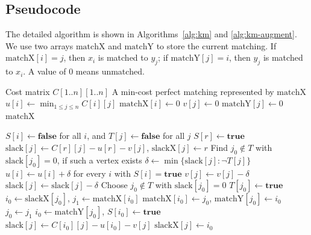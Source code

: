 \documentclass[acmsmall,nonacm]{acmart}
\theoremstyle{plain}
\theoremstyle{remark}
\begin{document}
\subsection{Pseudocode} 
\label{subsec:pseudocode}

The detailed algorithm is shown in Algorithms~\ref{alg:km} and
\ref{alg:km-augment}. We use two arrays $\text{matchX}$ and $\text{matchY}$ to
store the current matching. If $\text{matchX}[i]=j$, then $x_i$ is matched to
$y_j$; if $\text{matchY}[j]=i$, then $y_j$ is matched to $x_i$. A value of $0$
means unmatched.

\begin{algorithm}[t]
\caption{Kuhn--Munkres Algorithm for Min-Cost Perfect Matching}
\label{alg:km}
\begin{algorithmic}[1]
\Require Cost matrix $C[1..n][1..n]$
\Ensure A min-cost perfect matching represented by $\text{matchX}$
    \State $u[i] \gets \min_{1 \leq j \leq n} C[i][j]$
    \State $\text{matchX}[i] \gets 0$
\EndFor
{}
    \State $v[j] \gets 0$
    \State $\text{matchY}[j] \gets 0$
\EndFor
{}
    \State {}
\EndFor
\State \Return $\text{matchX}$
\end{algorithmic}
\end{algorithm}

\begin{algorithm}[t]
\caption{\textsc{Augment}$(r)$}
\label{alg:km-augment}
\begin{algorithmic}[1]
\State $S[i] \gets \textbf{false}$ for all $i$, and $T[j] \gets \textbf{false}$ for all $j$
\State $S[r] \gets \textbf{true}$
    \State $\text{slack}[j] \gets C[r][j]-u[r]-v[j]$, $\text{slackX}[j] \gets r$
\EndFor
{}
    \State Find $j_0\notin T$ with $\text{slack}[j_0]=0$, if such a vertex exists
        \State $\delta \gets \min\{\text{slack}[j] : \neg T[j]\}$
        \State $u[i] \gets u[i]+\delta$ for every $i$ with $S[i]=\textbf{true}$
                \State $v[j] \gets v[j]-\delta$
            \Else
                \State $\text{slack}[j] \gets \text{slack}[j]-\delta$
            \EndIf
        \EndFor
        \State Choose $j_0\notin T$ with $\text{slack}[j_0]=0$
    \EndIf
    \State $T[j_0] \gets \textbf{true}$
            \State $i_0 \gets \text{slackX}[j_0]$, $j_1 \gets \text{matchX}[i_0]$
            \State $\text{matchX}[i_0]\gets j_0$, $\text{matchY}[j_0]\gets i_0$
            \State $j_0 \gets j_1$
        \EndWhile
        \State \Return
    \EndIf
    \State $i_0 \gets \text{matchY}[j_0]$, $S[i_0]\gets\textbf{true}$
            \State $\text{slack}[j]\gets C[i_0][j]-u[i_0]-v[j]$
            \State $\text{slackX}[j]\gets i_0$
        \EndIf
    \EndFor
\EndWhile
\end{algorithmic}
\end{algorithm}
\end{document}
